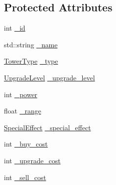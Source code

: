 \subsection*{Protected Attributes}
\begin{DoxyCompactItemize}
\item 
int \hyperlink{class_tower_a02ec2f8d1c4dea2f7fc002d8626c8b28}{\+\_\+id}
\item 
std\+::string \hyperlink{class_tower_ac29247d1ed8c97c105f5f1e05fb1f92c}{\+\_\+name}
\item 
\hyperlink{class_tower_a110a21c18d4ec095c6234bd17f004b3e}{Tower\+Type} \hyperlink{class_tower_adebb7de2d38284d29e3ca6b37c4a2be9}{\+\_\+type}
\item 
\hyperlink{class_tower_a23889cd9ee2fbae0420c97105fd6ebc8}{Upgrade\+Level} \hyperlink{class_tower_a0172731487da6a0480901e031e2aecbe}{\+\_\+upgrade\+\_\+level}
\item 
int \hyperlink{class_tower_af9e223c165f5632944868df3dfc70bee}{\+\_\+power}
\item 
float \hyperlink{class_tower_a77cd5002dac75320f83fb540a3878936}{\+\_\+range}
\item 
\hyperlink{class_tower_a355ab1cbcfd8c4d037ccf8937f784445}{Special\+Effect} \hyperlink{class_tower_ad6a84071c2e7f48386443c469961116c}{\+\_\+special\+\_\+effect}
\item 
int \hyperlink{class_tower_a102680a58c45f98a79609ce8961a7bed}{\+\_\+buy\+\_\+cost}
\item 
int \hyperlink{class_tower_ade771f89ab1aecb165efb74592e71261}{\+\_\+upgrade\+\_\+cost}
\item 
int \hyperlink{class_tower_a7f50414500ec524ccc6ffb7069328d1e}{\+\_\+sell\+\_\+cost}
\end{DoxyCompactItemize}


